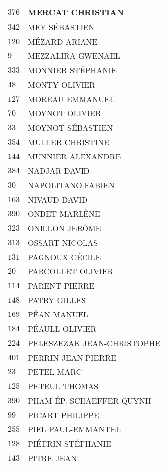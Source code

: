 \begin{xltabular}{\linewidth}{|l|X|}
    \hline
    $376$ & MERCAT CHRISTIAN \\
    \hline
    $342$ & MEY SÉBASTIEN \\
    \hline
    $120$ & MÉZARD ARIANE \\
    \hline
    $9$ & MEZZALIRA GWENAEL \\
    \hline
    $333$ & MONNIER STÉPHANIE \\
    \hline
    $48$ & MONTY OLIVIER \\
    \hline
    $127$ & MOREAU EMMANUEL \\
    \hline
    $70$ & MOYNOT OLIVIER \\
    \hline
    $33$ & MOYNOT SÉBASTIEN \\
    \hline
    $354$ & MULLER CHRISTINE \\
    \hline
    $144$ & MUNNIER ALEXANDRE \\
    \hline
    $384$ & NADJAR DAVID \\
    \hline
    $30$ & NAPOLITANO FABIEN \\
    \hline
    $163$ & NIVAUD DAVID \\
    \hline
    $390$ & ONDET MARLÈNE \\
    \hline
    $323$ & ONILLON JERÔME \\
    \hline
    $313$ & OSSART NICOLAS \\
    \hline
    $131$ & PAGNOUX CÉCILE \\
    \hline
    $20$ & PARCOLLET OLIVIER \\
    \hline
    $114$ & PARENT PIERRE \\
    \hline
    $148$ & PATRY GILLES \\
    \hline
    $169$ & PÉAN MANUEL \\
    \hline
    $184$ & PÉAULL OLIVIER \\
    \hline
    $224$ & PELESZEZAK JEAN-CHRISTOPHE \\
    \hline
    $401$ & PERRIN JEAN-PIERRE \\
    \hline
    $23$ & PETEL MARC \\
    \hline
    $125$ & PETEUL THOMAS \\
    \hline
    $390$ & PHAM ÉP. SCHAEFFER QUYNH \\
    \hline
    $99$ & PICART PHILIPPE \\
    \hline
    $255$ & PIEL PAUL-EMMANTEL \\
    \hline
    $128$ & PIÉTRIN STÉPHANIE \\
    \hline
    $143$ & PITRE JEAN \\

\end{xltabular}
